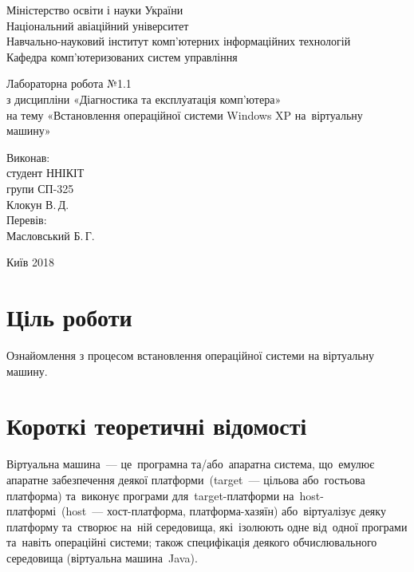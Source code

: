 \documentclass[
	a4paper,
	oneside,
	DIV = 12,
	12pt,
	headings = normal,
]{scrartcl}
\newcommand{\allcaps}[1]{{\addfontfeatures{LetterSpace = 5}#1}}
\begin{document}
	\begin{titlepage}
		\begin{center}
			Міністерство освіти і науки України\\
			Національний авіаційний університет\\
			Навчально-науковий інститут комп'ютерних інформаційних технологій\\
			Кафедра комп'ютеризованих систем управління

			\vspace{\fill}
				Лабораторна робота №1.1\\
				з дисципліни «Діагностика та експлуатація комп'ютера»\\
				на тему «Встановлення операційної системи Windows XP на~віртуальну машину»\\

			\vspace{\fill}

			\begin{flushright}
				Виконав:\\
				студент \allcaps{ННІКІТ}\\
				групи СП-325\\
				Клокун В.\,Д.\\
				Перевів:\\
				Масловський Б.\,Г.
			\end{flushright}

			Київ 2018
		\end{center}
	\end{titlepage}

	\section{Ціль роботи}
		Ознайомлення з процесом встановлення операційної системи на віртуальну машину.

	\section{Короткі теоретичні відомості}
		Віртуальна машина~— це~програмна та/або~апаратна система, що~емулює апаратне забезпечення деякої платформи~(target~— цільова або~гостьова платформа) та~виконує програми для~target-платформи на~host-платформі~(host~— хост-платформа, платформа-хазяїн) або~віртуалізує деяку платформу та~створює на~ній середовища, які~ізолюють одне від~одної програми та~навіть операційні системи; також специфікація деякого обчислювального середовища (віртуальна машина~Java).
\end{document}
